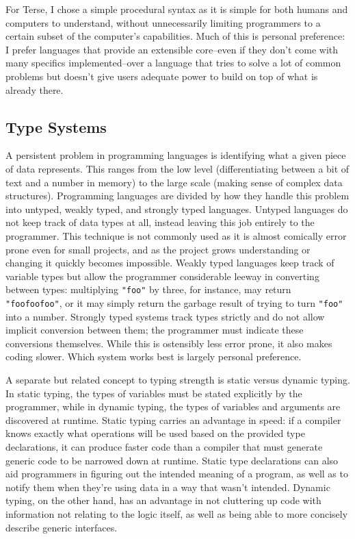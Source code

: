 \documentclass[12pt]{report}
\newcommand{\code}[1]{\texttt{#1}}
\begin{document}
For Terse, I chose a simple procedural syntax as it is simple for both
humans and computers to understand, without unnecessarily limiting
programmers to a certain subset of the computer's capabilities. Much
of this is personal preference: I prefer languages that provide an
extensible core--even if they don't come with many specifics
implemented--over a language that tries to solve a lot of common
problems but doesn't give users adequate power to build on top of what
is already there.

\subsection*{Type Systems}

A persistent problem in programming languages is identifying what a
given piece of data represents. This ranges from the low level
(differentiating between a bit of text and a number in memory) to the
large scale (making sense of complex data structures). Programming
languages are divided by how they handle this problem into untyped,
weakly typed, and strongly typed languages. Untyped languages do not
keep track of data types at all, instead leaving this job entirely to
the programmer. This technique is not commonly used as it is almost
comically error prone even for small projects, and as the project
grows understanding or changing it quickly becomes impossible. Weakly
typed languages keep track of variable types but allow the programmer
considerable leeway in converting between types: multiplying
\code{"foo"} by three, for instance, may return \code{"foofoofoo"}, or
it may simply return the garbage result of trying to turn \code{"foo"}
into a number. Strongly typed systems track types strictly and do not
allow implicit conversion between them; the programmer must indicate
these conversions themselves. While this is ostensibly less error
prone, it also makes coding slower. Which system works best is largely
personal preference.

A separate but related concept to typing strength is static versus
dynamic typing. In static typing, the types of variables must be
stated explicitly by the programmer, while in dynamic typing, the
types of variables and arguments are discovered at runtime. Static
typing carries an advantage in speed: if a compiler knows exactly what
operations will be used based on the provided type declarations, it
can produce faster code than a compiler that must generate generic
code to be narrowed down at runtime. Static type declarations can also
aid programmers in figuring out the intended meaning of a program, as
well as to notify them when they're using data in a way that wasn't
intended. Dynamic typing, on the other hand, has an advantage in not
cluttering up code with information not relating to the logic itself,
as well as being able to more concisely describe generic interfaces.
\end{document}
